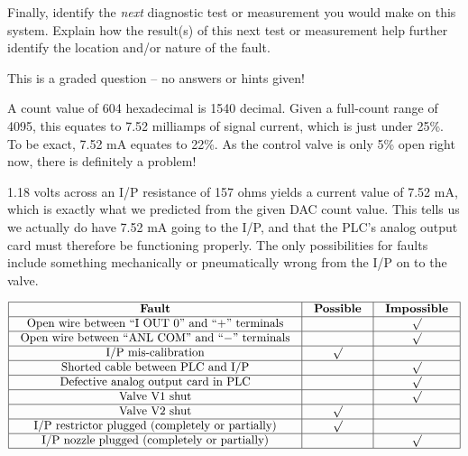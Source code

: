 Finally, identify the {\it next} diagnostic test or measurement you would make on this system.  Explain how the result(s) of this next test or measurement help further identify the location and/or nature of the fault.

\vfil 

\eject






This is a graded question -- no answers or hints given!







A count value of 604 hexadecimal is 1540 decimal.  Given a full-count range of 4095, this equates to 7.52 milliamps of signal current, which is just under 25\%.  To be exact, 7.52 mA equates to 22\%.  As the control valve is only 5\% open right now, there is definitely a problem!

\vskip 10pt

1.18 volts across an I/P resistance of 157 ohms yields a current value of 7.52 mA, which is exactly what we predicted from the given DAC count value.  This tells us we actually do have 7.52 mA going to the I/P, and that the PLC's analog output card must therefore be functioning properly.  The only possibilities for faults include something mechanically or pneumatically wrong from the I/P on to the valve.


$$\vbox{\offinterlineskip
\halign{\strut
\vrule \quad\hfil # \ \hfil & 
\vrule \quad\hfil # \ \hfil & 
\vrule \quad\hfil # \ \hfil \vrule \cr
\noalign{\hrule}
%
{\bf Fault} & {\bf Possible} & {\bf Impossible} \cr
%
\noalign{\hrule}
%
Open wire between ``I OUT 0'' and ``+'' terminals &  & $\surd$ \cr
%
\noalign{\hrule}
%
Open wire between ``ANL COM'' and ``$-$'' terminals &  & $\surd$ \cr
%
\noalign{\hrule}
%
I/P mis-calibration & $\surd$ &  \cr
%
\noalign{\hrule}
%
Shorted cable between PLC and I/P &  & $\surd$ \cr
%
\noalign{\hrule}
%
Defective analog output card in PLC &  & $\surd$ \cr
%
\noalign{\hrule}
%
Valve V1 shut &  & $\surd$ \cr
%
\noalign{\hrule}
%
Valve V2 shut & $\surd$ &  \cr
%
\noalign{\hrule}
%
I/P restrictor plugged (completely or partially) & $\surd$ &  \cr
%
\noalign{\hrule}
%
I/P nozzle plugged (completely or partially) &  & $\surd$ \cr
%
\noalign{\hrule}
} %
}$$ %

